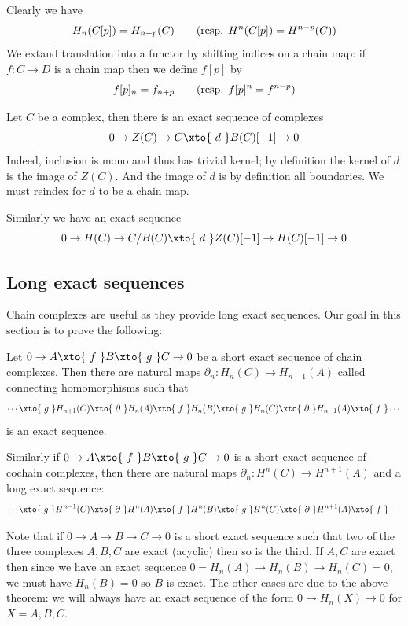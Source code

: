 \edefn

Clearly we have
$$ H_n(C[p]) = H_{n+p}(C)\qquad (\hbox{resp. }H^n(C[p])=H^{n-p}(C)) $$
We extand translation into a functor by shifting indices on a chain map: if $f\colon C\to D$ is a chain map then we define $f[p]$ by
$$ f[p]_n = f_{n+p}\qquad (\hbox{resp. }f[p]^n=f^{n-p}) $$

\bexam

    Let $C$ be a complex, then there is an exact sequence of complexes
    $$ 0 \to Z(C) \to C \xto{\ d\ } B(C)[-1] \to 0 $$
    Indeed, inclusion is mono and thus has trivial kernel; by definition the kernel of $d$ is the image of $Z(C)$.
    And the image of $d$ is by definition all boundaries.
    We must reindex for $d$ to be a chain map.

    Similarly we have an exact sequence
    $$ 0 \to H(C) \to C/B(C) \xto{\ d\ }Z(C)[-1] \to H(C)[-1] \to 0 $$

\eexam

\subsection{Long exact sequences}

Chain complexes are useful as they provide long exact sequences.
Our goal in this section is to prove the following:

\bthrm

    Let $0\to A\xto{\ f\ }B\xto{\ g\ }C\to0$ be a short exact sequence of chain complexes.
    Then there are natural maps $\partial_n\colon H_n(C)\to H_{n-1}(A)$ called {\emphcolor connecting homomorphisms} such that
    $$ \cdots\xto{\ g\ }H_{n+1}(C)\xto{\ \partial\ }H_n(A)\xto{\ f\ }H_n(B)\xto{\ g\ }H_n(C)\xto{\ \partial\ }H_{n-1}(A)\xto{\ f\ }\cdots $$
    is an exact sequence.

    Similarly if $0\to A\xto{\ f\ }B\xto{\ g\ }C\to0$ is a short exact sequence of cochain complexes, then there are natural maps $\partial_n\colon H^n(C)\to H^{n+1}(A)$
    and a long exact sequence:
    $$ \cdots\xto{\ g\ }H^{n-1}(C)\xto{\ \partial\ }H^n(A)\xto{\ f\ }H^n(B)\xto{\ g\ }H^n(C)\xto{\ \partial\ }H^{n+1}(A)\xto{\ f\ }\cdots $$

\ethrm

\bexam

    Note that if $0\to A\to B\to C\to 0$ is a short exact sequence such that two of the three complexes $A,B,C$ are exact (acyclic) then so is the third.
    If $A,C$ are exact then since we have an exact sequence $0=H_n(A)\to H_n(B)\to H_n(C)=0$, we must have $H_n(B)=0$ so $B$ is exact.
    The other cases are due to the above theorem: we will always have an exact sequence of the form $0\to H_n(X)\to0$ for $X=A,B,C$.

